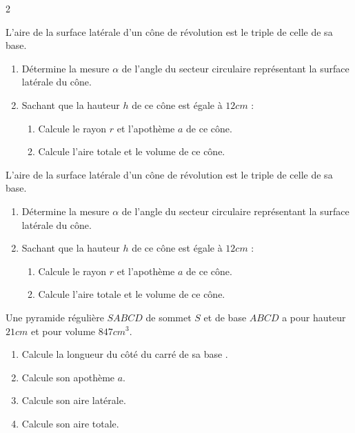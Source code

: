\begin{multicols}{2}
  	\begin{center}
  	\end{center}
  	\begin{center}
  	\end{center}
  	L'aire de la surface latérale d'un cône de révolution est le triple de celle de sa base.
  	\begin{enumerate}
  		\item Détermine la mesure $\alpha$  de l'angle  du secteur circulaire représentant la surface latérale du cône.
  		\item  Sachant que la hauteur $h$ de ce cône est égale à $12 cm$ :
  		\begin{enumerate}
  			\item  Calcule le rayon $r$ et l'apothème $a$ de ce cône.
  			\item  Calcule l'aire totale et le volume de ce cône.
  		\end{enumerate}
  	\end{enumerate}
  
  	\begin{center}
  	\end{center}
  	\begin{center}
  	\end{center}
  	L'aire de la surface latérale d'un cône de révolution est le triple de celle de sa base.
  	\begin{enumerate}
  		\item Détermine la mesure $\alpha$  de l'angle  du secteur circulaire représentant la surface latérale du cône.
  		\item  Sachant que la hauteur $h$ de ce cône est égale à $12 cm$ :
  		\begin{enumerate}
  			\item  Calcule le rayon $r$ et l'apothème $a$ de ce cône.
  			\item  Calcule l'aire totale et le volume de ce cône.
  		\end{enumerate}
  	\end{enumerate}
  	\begin{center}
  	\end{center}
  	Une pyramide régulière $SABCD$ de sommet $S$  et de base $ABCD$ a pour hauteur $21 cm$  et pour volume $847 cm^{3}$.
  	\begin{enumerate}
  		\item  Calcule la longueur du côté du carré de sa base .
  		\item  Calcule son apothème $a$.
  		\item Calcule son aire latérale.
  		\item Calcule son aire totale.
  	\end{enumerate}
  	

\end{multicols}
